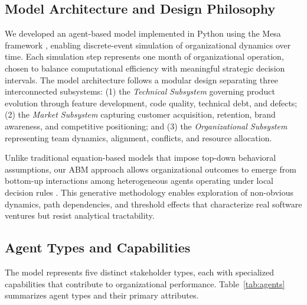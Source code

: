\documentclass[alpha-refs]{wiley-article}
\begin{document}
\subsection{Model Architecture and Design Philosophy}

We developed an agent-based model implemented in Python using the Mesa framework \cite{wilensky2015}, enabling discrete-event simulation of organizational dynamics over time. Each simulation step represents one month of organizational operation, chosen to balance computational efficiency with meaningful strategic decision intervals. The model architecture follows a modular design separating three interconnected subsystems: (1) the \textit{Technical Subsystem} governing product evolution through feature development, code quality, technical debt, and defects; (2) the \textit{Market Subsystem} capturing customer acquisition, retention, brand awareness, and competitive positioning; and (3) the \textit{Organizational Subsystem} representing team dynamics, alignment, conflicts, and resource allocation.

Unlike traditional equation-based models that impose top-down behavioral assumptions, our ABM approach allows organizational outcomes to emerge from bottom-up interactions among heterogeneous agents operating under local decision rules \cite{north2013}. This generative methodology enables exploration of non-obvious dynamics, path dependencies, and threshold effects that characterize real software ventures but resist analytical tractability.

\subsection{Agent Types and Capabilities}

The model represents five distinct stakeholder types, each with specialized capabilities that contribute to organizational performance. Table~\ref{tab:agents} summarizes agent types and their primary attributes.
\end{document}
